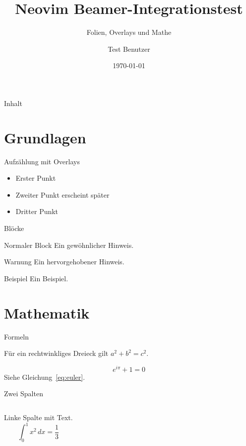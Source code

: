 \documentclass[aspectratio=169]{beamer}
\title{Neovim Beamer-Integrationstest}
\subtitle{Folien, Overlays und Mathe}
\author{Test Benutzer}
\date{\today}
\begin{document}
\begin{frame}
    \titlepage
\end{frame}

\begin{frame}{Inhalt}
    \tableofcontents
\end{frame}

\section{Grundlagen}

\begin{frame}{Aufzählung mit Overlays}
    \begin{itemize}
        \item<1-> Erster Punkt
        \item<2-> Zweiter Punkt erscheint später
        \item<3-> Dritter Punkt
    \end{itemize}
\end{frame}

\begin{frame}{Blöcke}
    \begin{block}{Normaler Block}
        Ein gewöhnlicher Hinweis.
    \end{block}
    \begin{alertblock}{Warnung}
        Ein hervorgehobener Hinweis.
    \end{alertblock}
    \begin{exampleblock}{Beispiel}
        Ein Beispiel.
    \end{exampleblock}
\end{frame}

\section{Mathematik}

\begin{frame}{Formeln}
    \begin{theorem}[Pythagoras]
        Für ein rechtwinkliges Dreieck gilt $a^2 + b^2 = c^2$.
    \end{theorem}
    \begin{equation}
        \label{eq:euler}
        e^{i\pi} + 1 = 0
    \end{equation}
    Siehe Gleichung~\eqref{eq:euler}.
\end{frame}

\begin{frame}{Zwei Spalten}
    \begin{columns}
        Linke Spalte mit Text.
        \[
            \int_0^1 x^2 \, dx = \frac{1}{3}
        \]
    \end{columns}
\end{frame}
\end{document}
